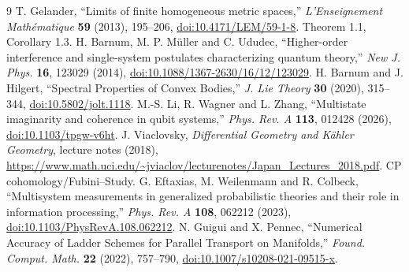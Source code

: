 \documentclass[10pt,letterpaper]{article}
\begin{document}
\begin{thebibliography}{9}\small
{} T. Gelander, ``Limits of finite homogeneous metric spaces,'' \emph{L'Enseignement Math\'ematique} \textbf{59} (2013), 195--206, \href{https://doi.org/10.4171/LEM/59-1-8}{doi:10.4171/LEM/59-1-8}. Theorem 1.1, Corollary 1.3.
 H. Barnum, M. P. M\"uller and C. Ududec, ``Higher-order interference and single-system postulates characterizing quantum theory,'' \emph{New J. Phys.} \textbf{16}, 123029 (2014), \href{https://doi.org/10.1088/1367-2630/16/12/123029}{doi:10.1088/1367-2630/16/12/123029}.
 H. Barnum and J. Hilgert, ``Spectral Properties of Convex Bodies,'' \emph{J. Lie Theory} \textbf{30} (2020), 315--344, \href{https://doi.org/10.5802/jolt.1118}{doi:10.5802/jolt.1118}.
 M.-S. Li, R. Wagner and L. Zhang, ``Multistate imaginarity and coherence in qubit systems,'' \emph{Phys. Rev. A} \textbf{113}, 012428 (2026), \href{https://doi.org/10.1103/tpgw-v6ht}{doi:10.1103/tpgw-v6ht}.
 J. Viaclovsky, \emph{Differential Geometry and K\"ahler Geometry}, lecture notes (2018), \url{https://www.math.uci.edu/~jviaclov/lecturenotes/Japan_Lectures_2018.pdf}. CP cohomology/Fubini--Study.
 G. Eftaxias, M. Weilenmann and R. Colbeck, ``Multisystem measurements in generalized probabilistic theories and their role in information processing,'' \emph{Phys. Rev. A} \textbf{108}, 062212 (2023), \href{https://doi.org/10.1103/PhysRevA.108.062212}{doi:10.1103/PhysRevA.108.062212}.
 N. Guigui and X. Pennec, ``Numerical Accuracy of Ladder Schemes for Parallel Transport on Manifolds,'' \emph{Found. Comput. Math.} \textbf{22} (2022), 757--790, \href{https://doi.org/10.1007/s10208-021-09515-x}{doi:10.1007/s10208-021-09515-x}.
\end{thebibliography}
\end{document}
